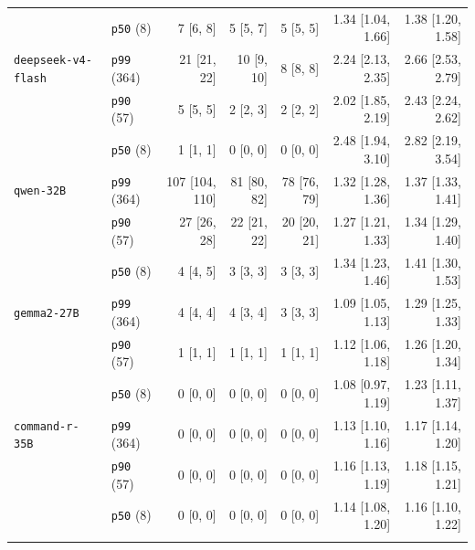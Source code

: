 \begin{table}
\begin{tabular}{@{}l l r r r r r@{}}
 & \texttt{p50} (8) & 7 [6{,} 8] & 5 [5{,} 7] & 5 [5{,} 5] & 1.34 [1.04{,} 1.66] & 1.38 [1.20{,} 1.58]\\
\addlinespace
\texttt{deepseek-v4-flash} & \texttt{p99} (364) & 21 [21{,} 22] & 10 [9{,} 10] & 8 [8{,} 8] & 2.24 [2.13{,} 2.35] & 2.66 [2.53{,} 2.79]\\
 & \texttt{p90} (57) & 5 [5{,} 5] & 2 [2{,} 3] & 2 [2{,} 2] & 2.02 [1.85{,} 2.19] & 2.43 [2.24{,} 2.62]\\
 & \texttt{p50} (8) & 1 [1{,} 1] & 0 [0{,} 0] & 0 [0{,} 0] & 2.48 [1.94{,} 3.10] & 2.82 [2.19{,} 3.54]\\
\addlinespace
\texttt{qwen-32B} & \texttt{p99} (364) & 107 [104{,} 110] & 81 [80{,} 82] & 78 [76{,} 79] & 1.32 [1.28{,} 1.36] & 1.37 [1.33{,} 1.41]\\
 & \texttt{p90} (57) & 27 [26{,} 28] & 22 [21{,} 22] & 20 [20{,} 21] & 1.27 [1.21{,} 1.33] & 1.34 [1.29{,} 1.40]\\
 & \texttt{p50} (8) & 4 [4{,} 5] & 3 [3{,} 3] & 3 [3{,} 3] & 1.34 [1.23{,} 1.46] & 1.41 [1.30{,} 1.53]\\
\addlinespace
\texttt{gemma2-27B} & \texttt{p99} (364) & 4 [4{,} 4] & 4 [3{,} 4] & 3 [3{,} 3] & 1.09 [1.05{,} 1.13] & 1.29 [1.25{,} 1.33]\\
 & \texttt{p90} (57) & 1 [1{,} 1] & 1 [1{,} 1] & 1 [1{,} 1] & 1.12 [1.06{,} 1.18] & 1.26 [1.20{,} 1.34]\\
 & \texttt{p50} (8) & 0 [0{,} 0] & 0 [0{,} 0] & 0 [0{,} 0] & 1.08 [0.97{,} 1.19] & 1.23 [1.11{,} 1.37]\\
\addlinespace
\texttt{command-r-35B} & \texttt{p99} (364) & 0 [0{,} 0] & 0 [0{,} 0] & 0 [0{,} 0] & 1.13 [1.10{,} 1.16] & 1.17 [1.14{,} 1.20]\\
 & \texttt{p90} (57) & 0 [0{,} 0] & 0 [0{,} 0] & 0 [0{,} 0] & 1.16 [1.13{,} 1.19] & 1.18 [1.15{,} 1.21]\\
 & \texttt{p50} (8) & 0 [0{,} 0] & 0 [0{,} 0] & 0 [0{,} 0] & 1.14 [1.08{,} 1.20] & 1.16 [1.10{,} 1.22]\\
\addlinespace
\bottomrule
\end{tabular}
\end{table}
